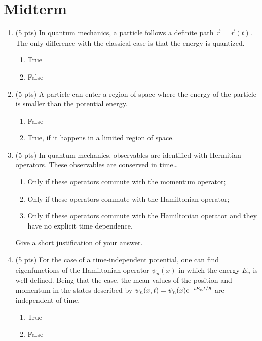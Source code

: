 \documentclass[../notes.tex]{subfiles}
\begin{document}
\section{Midterm}
\begin{enumerate}[label={\textbf{\arabic*.}}]
    \item {}(5 pts) In quantum mechanics, a particle follows a definite path $\vec{r}=\vec{r}(t)$. The only difference with the classical case is that the energy is quantized.
    \begin{enumerate}[label={\textbf{\alph*.}}]
        \item True
        \item False
    \end{enumerate}
    \item (5 pts) A particle can enter a region of space where the energy of the particle is smaller than the potential energy.
    \begin{enumerate}[label={\textbf{\alph*.}}]
        \item False
        \item True, if it happens in a limited region of space.
    \end{enumerate}
    \item (5 pts) In quantum mechanics, observables are identified with Hermitian operators. These observables are conserved in time\dots
    \begin{enumerate}[label={\textbf{\alph*.}}]
        \item Only if these operators commute with the momentum operator;
        \item Only if these operators commute with the Hamiltonian operator;
        \item Only if these operators commute with the Hamiltonian operator and they have no explicit time dependence.
    \end{enumerate}
    Give a short justification of your answer.
    \item (5 pts) For the case of a time-independent potential, one can find eigenfunctions of the Hamiltonian operator $\psi_n(x)$ in which the energy $E_n$ is well-defined. Being that the case, the mean values of the position and momentum in the states described by $\psi_n(x,t)=\psi_n(x)\e[-iE_nt/\hbar]$ are independent of time.
    \begin{enumerate}[label={\textbf{\alph*.}}]
        \item True
        \item False
    \end{enumerate}

\end{enumerate}
\end{document}
